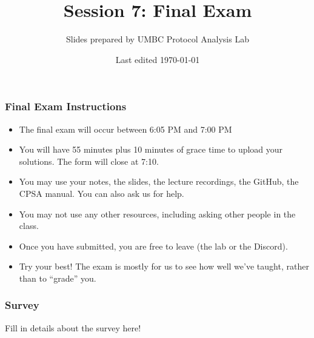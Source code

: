 \documentclass[red]{beamer}
\begin{document}

\title{Session 7: Final Exam}
\author{Slides prepared by UMBC Protocol Analysis Lab}
\date{Last edited \today}
\begin{frame}
\maketitle
\end{frame}

\begin{frame}\frametitle{Final Exam Instructions}
\begin{itemize}
\item The final exam will occur between 6:05 PM and 7:00 PM
\item You will have 55 minutes plus 10 minutes of grace time to upload your solutions.
The form will close at 7:10.
\item You may use your notes, the slides, the lecture recordings, the GitHub, the CPSA manual. 
You can also ask us for help.
\item You may not use any other resources, including asking other people in the class.
\item Once you have submitted, you are free to leave (the lab or the Discord).
\item Try your best! The exam is mostly for us to see how well we've taught, rather than to ``grade'' you.
\end{itemize}
\end{frame}

\begin{frame}\frametitle{Survey}
Fill in details about the survey here!
\end{frame}
\end{document}
